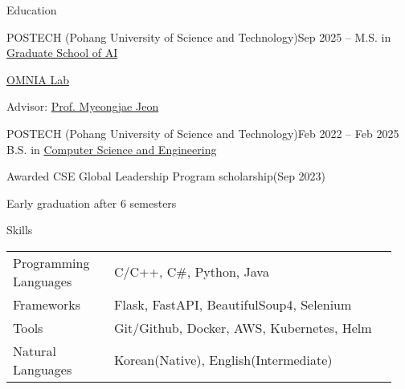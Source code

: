 \documentclass{resume}
\begin{document}
\begin{rSection}{Education}
    \begin{rSubsection}{POSTECH (Pohang University of Science and Technology)}{Sep 2025 --}
        M.S. in \href{https://cse.postech.ac.kr}{Graduate School of AI}

        \item \href{https://omnia.postech.ac.kr}{OMNIA Lab}

        \item Advisor: \href{https://sites.google.com/site/myeongjae/}{Prof. Myeongjae Jeon}
    \end{rSubsection}

    \begin{rSubsection}{POSTECH (Pohang University of Science and Technology)}{Feb 2022 -- Feb 2025}
        B.S. in \href{https://cse.postech.ac.kr}{Computer Science and Engineering}

        \item Awarded CSE Global Leadership Program scholarship(Sep 2023)

        \item Early graduation after 6 semesters
    \end{rSubsection}
\end{rSection}

\begin{rSection}{Skills}
    \begin{tabular}{@{}p{0.25\linewidth}p{0.7\linewidth}}
        Programming Languages
            & C/C++, C\#, Python, Java \\ [0.3em]

        Frameworks
            & Flask, FastAPI, BeautifulSoup4, Selenium \\ [0.3em]

        Tools
            & Git/Github, Docker, AWS, Kubernetes, Helm \\ [0.3em]

        Natural Languages
            & Korean(Native), English(Intermediate)
    \end{tabular}
\end{rSection}
\end{document}
